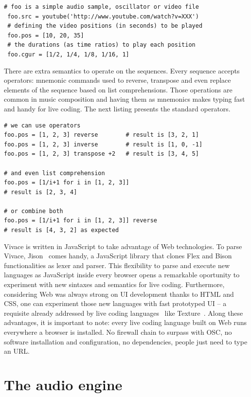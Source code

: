 \documentclass[letterpaper, 12pt]{article}
\begin{document}
\begin{Verbatim}[fontfamily=courier, xleftmargin=\parindent]
 # foo is a simple audio sample, oscillator or video file
 foo.src = youtube('http://www.youtube.com/watch?v=XXX')
 # defining the video positions (in seconds) to be played
 foo.pos = [10, 20, 35]
 # the durations (as time ratios) to play each position
 foo.cgur = [1/2, 1/4, 1/8, 1/16, 1]
\end{Verbatim}

There are extra semantics to operate on the sequences. Every sequence
accepts operators: mnemonic commands used to reverse, transpose and
even replace elements of the sequence based on list
comprehensions. Those operations are common in music composition and
having them as mnemonics makes typing fast and handy for live
coding. The next listing presents the standard operators.

\begin{Verbatim}[fontfamily=courier, xleftmargin=\parindent]
# we can use operators
foo.pos = [1, 2, 3] reverse        # result is [3, 2, 1]
foo.pos = [1, 2, 3] inverse        # result is [1, 0, -1]
foo.pos = [1, 2, 3] transpose +2   # result is [3, 4, 5]

# and even list comprehension
foo.pos = [1/i+1 for i in [1, 2, 3]] 
# result is [2, 3, 4]

# or combine both
foo.pos = [1/i+1 for i in [1, 2, 3]] reverse 
# result is [4, 3, 2] as expected
\end{Verbatim}

Vivace is written in JavaScript to take advantage of Web technologies.
To parse Vivace, Jison~\citep*{jison} comes handy, a JavaScript
library that clones Flex and Bison functionalities as lexer and
parser. This flexibility to parse and execute new languages as
JavaScript inside every browser opens a remarkable oportunity to
experiment with new sintaxes and semantics for live
coding. Furthermore, considering Web was always strong on UI
development thanks to HTML and CSS, one can experiment those new
languages with fast prototyped UI -- a requisite already addressed by
live coding languages~\citep*{magnusson2011algorithms} like
Texture~\citep*{mclean2011texture}. Along these advantages, it is
important to note: every live coding language built on Web runs
everywhere a browser is installed. No firewall chain to surpass with
OSC, no software installation and configuration, no dependencies,
people just need to type an URL.

\section{The audio engine}
\end{document}
